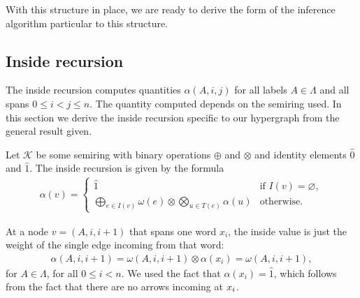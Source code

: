  With this structure in place, we are ready to derive the form of the inference algorithm particular to this structure.

\subsection{Inside recursion}
  The inside recursion computes quantities $\alpha(A,i,j)$ for all labels $A \in \Lambda$ and all spans $0 \leq i < j \leq n$. The quantity computed depends on the semiring used. In this section we derive the inside recursion specific to our hypergraph from the general result given.

  Let $\mathcal{K}$ be some semiring with binary operations $\oplus$ and $\otimes$ and identity elements $\hat{0}$ and $\hat{1}$. The inside recursion is given by the formula \citep{goodman1999semiring}
  \begin{align*}
    \alpha(v) =
      \begin{cases}
        \hat{1}  &  \mbox{if } I(v) = \varnothing,  \\
        \displaystyle\bigoplus_{e \in I(v)} \omega(e) \otimes \displaystyle\bigotimes_{u \in T(e)} \alpha(u)  & \mbox{otherwise.}
      \end{cases}
  \end{align*}

  At a node $v = (A, i, i+1)$ that spans one word $x_i$, the inside value is just the weight of the single edge incoming from that word:
  \begin{align}
      \label{eq:inside-base}
      \alpha(A, i, i+1) = \omega(A, i, i+1) \otimes \alpha(x_i) = \omega(A, i, i+1),
  \end{align}
  for $A \in \Lambda$, for all $0 \leq i < n$. We used the fact that $\alpha(x_i) = \hat{1}$, which follows from the fact that there are no arrows incoming at $x_i$.

